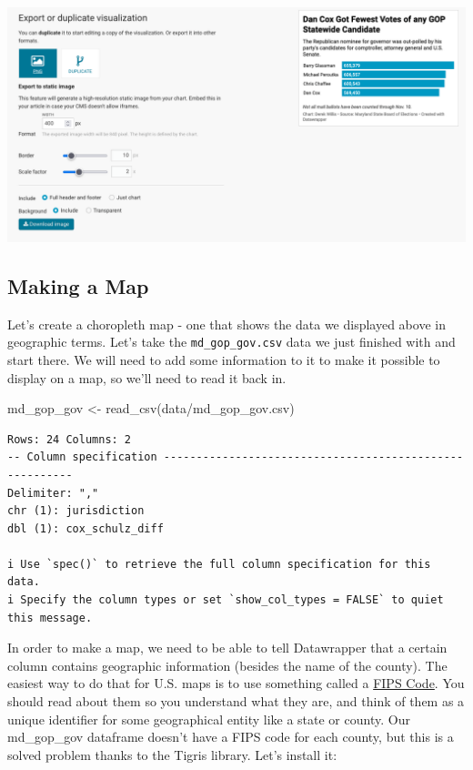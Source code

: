 \documentclass[
  letterpaper,
  DIV=11,
  numbers=noendperiod]{scrreprt}
\newenvironment{Shaded}{\begin{snugshade}}{\end{snugshade}}
\newcommand{\FunctionTok}[1]{\textcolor[rgb]{0.28,0.35,0.67}{#1}}
\newcommand{\NormalTok}[1]{\textcolor[rgb]{0.00,0.23,0.31}{#1}}
\newcommand{\OtherTok}[1]{\textcolor[rgb]{0.00,0.23,0.31}{#1}}
\newcommand{\StringTok}[1]{\textcolor[rgb]{0.13,0.47,0.30}{#1}}
\begin{document}
\includegraphics{./images/datawrapper6.png}

\hypertarget{making-a-map}{%
\subsection{Making a Map}\label{making-a-map}}

Let's create a choropleth map - one that shows the data we displayed
above in geographic terms. Let's take the \texttt{md\_gop\_gov.csv} data
we just finished with and start there. We will need to add some
information to it to make it possible to display on a map, so we'll need
to read it back in.

\begin{Shaded}
\begin{Highlighting}[]
\NormalTok{md\_gop\_gov }\OtherTok{\textless{}{-}} \FunctionTok{read\_csv}\NormalTok{(}\StringTok{\textquotesingle{}data/md\_gop\_gov.csv\textquotesingle{}}\NormalTok{)}
\end{Highlighting}
\end{Shaded}

\begin{verbatim}
Rows: 24 Columns: 2
-- Column specification --------------------------------------------------------
Delimiter: ","
chr (1): jurisdiction
dbl (1): cox_schulz_diff

i Use `spec()` to retrieve the full column specification for this data.
i Specify the column types or set `show_col_types = FALSE` to quiet this message.
\end{verbatim}

In order to make a map, we need to be able to tell Datawrapper that a
certain column contains geographic information (besides the name of the
county). The easiest way to do that for U.S. maps is to use something
called a
\href{https://www.census.gov/programs-surveys/geography/guidance/geo-identifiers.html}{FIPS
Code}. You should read about them so you understand what they are, and
think of them as a unique identifier for some geographical entity like a
state or county. Our md\_gop\_gov dataframe doesn't have a FIPS code for
each county, but this is a solved problem thanks to the Tigris library.
Let's install it:
\end{document}
